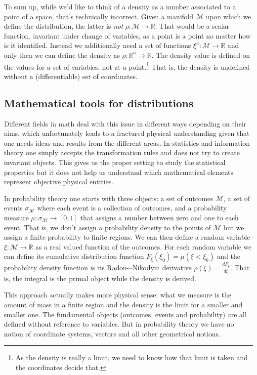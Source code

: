 \documentclass[11pt]{article}
\begin{document}
To sum up, while we'd like to think of a density as a number associated to a point of a space, that's technically incorrect. Given a manifold $\mathcal{M}$ upon which we define the distribution, the latter is \emph{not} $\rho : \mathcal{M} \to \mathbb{R}$. That would be a scalar function, invariant under change of variables, as a point is a point no matter how is it identified. Instead we additionally need a set of functions $\xi^a : \mathcal{M} \to \mathbb{R}$ and only then we can define the density as $\rho : \mathbb{R}^n \to \mathbb{R}$. The density value is defined on the values for a set of variables, not at a point.\footnote{As the density is really a limit, we need to know how that limit is taken and the coordinates decide that.} That is, the density is undefined without a (differentiable) set of coordinates.

\subsection*{Mathematical tools for distributions}

Different fields in math deal with this issue in different ways depending on their aims, which unfortunately leads to a fractured physical understanding given that one needs ideas and results from the different areas. In statistics and information theory one simply accepts the transformation rules and does not try to create invariant objects. This gives us the proper setting to study the statistical properties but it does not help us understand which mathematical elements represent objective physical entities.

In probability theory one starts with three objects: a set of outcomes $\mathcal{M}$, a set of events $\sigma_\mathcal{M}$ where each event is a collection of outcomes, and a probability measure $\mu : \sigma_\mathcal{M} \rightarrow [0,1]$ that assigns a number between zero and one to each event. That is, we don't assign a probability density to the points of $\mathcal{M}$ but we assign a finite probability to finite regions. We can then define a random variable $\xi : \mathcal{M} \rightarrow \mathbb{R}$ as a real valued function of the outcomes. For each random variable we can define its cumulative distribution function $F_\xi(\xi_0)=\mu(\xi<\xi_0)$ and the probability density function is its Radon-–Nikodym derivative $\rho(\xi) = \frac{dF_\xi}{d\xi}$. That is, the integral is the primal object while the density is derived.

This approach actually makes more physical sense: what we measure is the amount of mass in a finite region and the density is the limit for a smaller and smaller one. The fundamental objects (outcomes, events and probability) are all defined without reference to variables. But in probability theory we have no notion of coordinate systems, vectors and all other geometrical notions.
\end{document}
